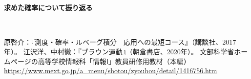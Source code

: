 \documentclass[luatexja,fontsize=12pt]{jlreq}\usepackage{ifthen}\newcounter{enlarge}\setcounter{enlarge}{1}
\begin{document}
\paragraph{求めた確率について振り返る}\mbox{}\\
\indent

\begin{thebibliography}{99}
 原啓介：『測度・確率・ルベーグ積分　応用への最短コース』（講談社、2017年）。
 江沢洋、中村徹：『ブラウン運動』（朝倉書店、2020年）。
 文部科学省ホームページの高等学校情報科「情報Ⅰ」教員研修用教材（本編）\url{https://www.mext.go.jp/a_menu/shotou/zyouhou/detail/1416756.htm}
\end{thebibliography}
\end{document}
